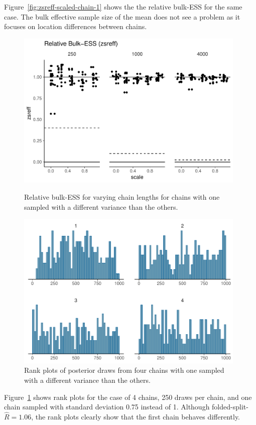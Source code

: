\documentclass[american,]{article}
\theoremstyle{definition}
\begin{document}
Figure~\ref{fig:zsreff-scaled-chain-1} shows the the relative bulk-ESS
for the same case. The bulk effective sample
size of the mean does not see a problem as it focuses on location
differences between chains.
\begin{figure}[tp]
  \centering
  \begin{minipage}{0.48\textwidth}
  \includegraphics[width=0.98\textwidth]{graphics/zsreff-scaled-chain-1.pdf}
  \caption{Relative bulk-ESS for varying chain lengths for chains with
    one sampled with a different variance than the others.}
  \label{fig:zsreff-scaled-chain-1}
\end{minipage}
\hfill
  \begin{minipage}{0.48\textwidth}
  \includegraphics[width=0.98\textwidth]{graphics/hist-scaled-chain-1.pdf}
  \caption{Rank plots of posterior draws from four chains with
    one sampled with a different variance than the others.}
  \label{fig:hist-scaled-chain-1}
\end{minipage}
\end{figure}
Figure~\ref{fig:hist-scaled-chain-1} shows rank plots for the case of
4 chains, 250 draws per chain, and one chain sampled with standard
deviation 0.75 instead of 1. Although
folded-split-\(\widehat{R} = 1.06\), the rank plots clearly show that
the first chain behaves differently.
\end{document}
